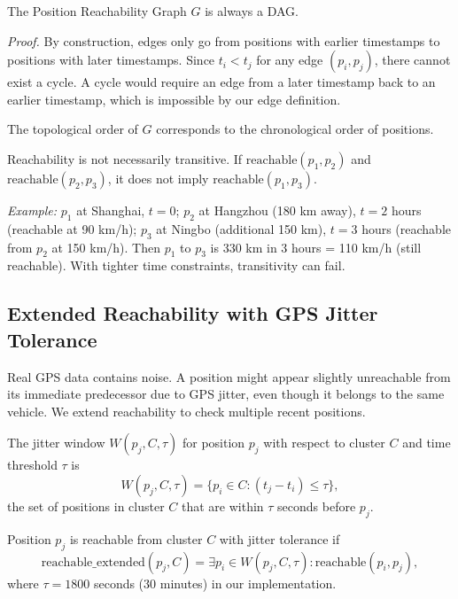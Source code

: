 \begin{property}
The Position Reachability Graph $G$ is always a DAG.
\end{property}
\textit{Proof.} By construction, edges only go from positions with earlier timestamps to positions with later timestamps. Since $t_i < t_j$ for any edge $(p_i, p_j)$, there cannot exist a cycle. A cycle would require an edge from a later timestamp back to an earlier timestamp, which is impossible by our edge definition.

\begin{property}
The topological order of $G$ corresponds to the chronological order of positions.
\end{property}

\begin{property}[Transitivity]
Reachability is not necessarily transitive. If $\mathrm{reachable}(p_1, p_2)$ and $\mathrm{reachable}(p_2, p_3)$, it does not imply $\mathrm{reachable}(p_1, p_3)$.
\end{property}
\textit{Example:} $p_1$ at Shanghai, $t=0$; $p_2$ at Hangzhou (180 km away), $t=2$ hours (reachable at 90 km/h); $p_3$ at Ningbo (additional 150 km), $t=3$ hours (reachable from $p_2$ at 150 km/h). Then $p_1$ to $p_3$ is 330 km in 3 hours = 110 km/h (still reachable). With tighter time constraints, transitivity can fail.

\subsection{Extended Reachability with GPS Jitter Tolerance}
Real GPS data contains noise. A position might appear slightly unreachable from its immediate predecessor due to GPS jitter, even though it belongs to the same vehicle. We extend reachability to check multiple recent positions.

\begin{definition}
The jitter window $W(p_j, C, \tau)$ for position $p_j$ with respect to cluster $C$ and time threshold $\tau$ is
\[
W(p_j, C, \tau) = \{p_i \in C : (t_j - t_i) \leq \tau\},
\]
the set of positions in cluster $C$ that are within $\tau$ seconds before $p_j$.
\end{definition}

\begin{definition}
Position $p_j$ is reachable from cluster $C$ with jitter tolerance if
\[
\mathrm{reachable\_extended}(p_j, C) = \exists p_i \in W(p_j, C, \tau) : \mathrm{reachable}(p_i, p_j),
\]
where $\tau = 1800$ seconds (30 minutes) in our implementation.
\end{definition}

